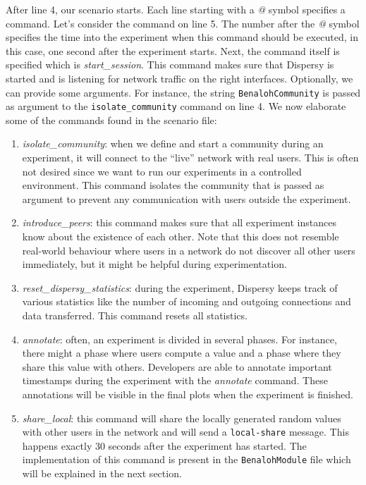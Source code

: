 \documentclass{article}
\begin{document}
After line 4, our scenario starts.
Each line starting with a \emph{@} symbol specifies a command.
Let's consider the command on line 5.
The number after the \emph{@} symbol specifies the time into the experiment when this command should be executed, in this case, one second after the experiment starts.
Next, the command itself is specified which is \emph{start\_session}.
This command makes sure that Dispersy is started and is listening for network traffic on the right interfaces.
Optionally, we can provide some arguments.
For instance, the string \texttt{BenalohCommunity} is passed as argument to the \texttt{isolate\_community} command on line 4.
We now elaborate some of the commands found in the scenario file:
\begin{enumerate}
	\item \emph{isolate\_community}: when we define and start a community during an experiment, it will connect to the \enquote{live} network with real users. This is often not desired since we want to run our experiments in a controlled environment. This command isolates the community that is passed as argument to prevent any communication with users outside the experiment.
	\item \emph{introduce\_peers}: this command makes sure that all experiment instances know about the existence of each other. Note that this does not resemble real-world behaviour where users in a network do not discover all other users immediately, but it might be helpful during experimentation.
	\item \emph{reset\_dispersy\_statistics}: during the experiment, Dispersy keeps track of various statistics like the number of incoming and outgoing connections and data transferred. This command resets all statistics.
	\item \emph{annotate}: often, an experiment is divided in several phases. For instance, there might a phase where users compute a value and a phase where they share this value with others. Developers are able to annotate important timestamps during the experiment with the \emph{annotate} command. These annotations will be visible in the final plots when the experiment is finished.
	\item \emph{share\_local}: this command will share the locally generated random values with other users in the network and will send a \texttt{local-share} message. This happens exactly 30 seconds after the experiment has started. The implementation of this command is present in the \texttt{BenalohModule} file which will be explained in the next section.

\end{enumerate}
\end{document}
